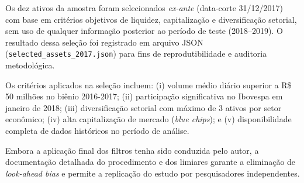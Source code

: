 Os dez ativos da amostra foram selecionados \textit{ex-ante} (data-corte 31/12/2017) com base em critérios objetivos de liquidez, capitalização e diversificação setorial, sem uso de qualquer informação posterior ao período de teste (2018–2019). O resultado dessa seleção foi registrado em arquivo JSON (\texttt{selected\_assets\_2017.json}) para fins de reprodutibilidade e auditoria metodológica.

Os critérios aplicados na seleção incluem: (i) volume médio diário superior a R\$ 50 milhões no biênio 2016-2017; (ii) participação significativa no Ibovespa em janeiro de 2018; (iii) diversificação setorial com máximo de 3 ativos por setor econômico; (iv) alta capitalização de mercado (\textit{blue chips}); e (v) disponibilidade completa de dados históricos no período de análise.

Embora a aplicação final dos filtros tenha sido conduzida pelo autor, a documentação detalhada do procedimento e dos limiares garante a eliminação de \textit{look-ahead bias} e permite a replicação do estudo por pesquisadores independentes.